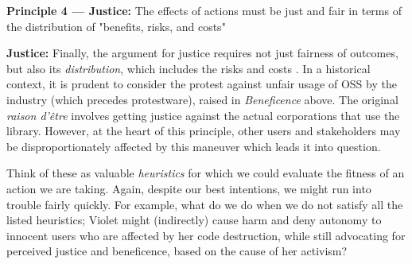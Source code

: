 \documentclass[journal,twocolumn]{IEEEtran}
\begin{document}
\begin{tcolorbox}
    \textbf{Principle 4 --- Justice:} The effects of actions must be just and fair in terms of the distribution of "benefits, risks, and costs" \cite{Beauchamp1994}
\end{tcolorbox}

\textbf{Justice:}
Finally, the argument for justice requires not just fairness of outcomes, but also its \textit{distribution}, which includes the risks and costs \cite{Beauchamp1994}. 
In a historical context, it is prudent to consider the protest against unfair usage of OSS by the industry (which precedes protestware), raised in \textit{Beneficence} above. The original \textit{raison d'\^{e}tre} involves getting justice against the actual corporations that use the library. However, at the heart of this principle, other users and stakeholders may be disproportionately affected by this maneuver which leads it into question. 

\vspace{8pt}
Think of these as valuable \textit{heuristics} for which we could evaluate the fitness of an action we are taking. Again, despite our best intentions, we might run into trouble fairly quickly. For example, what do we do when we do not satisfy all the listed heuristics; Violet might (indirectly) cause harm and deny autonomy to innocent users who are affected by her code destruction, while still advocating for perceived justice and  beneficence, based on the cause of her activism?





\end{document}
